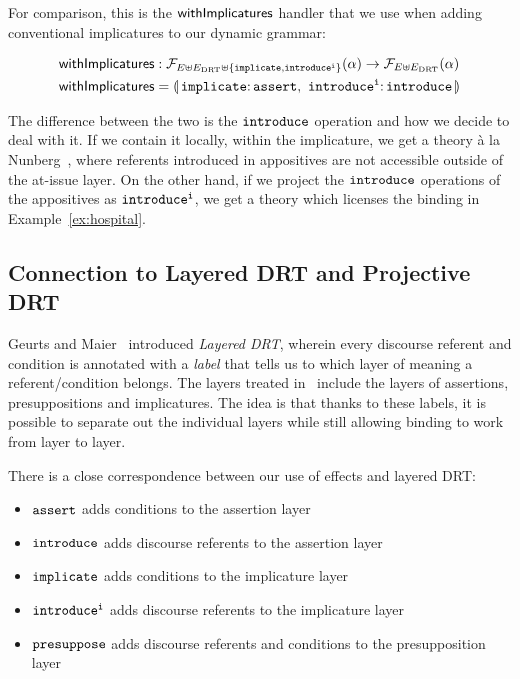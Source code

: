 For comparison, this is the $\mathsf{withImplicatures}$ handler that we use when
adding conventional implicatures to our dynamic grammar:

\begin{align*}
  \withImplicatures &: \FF_{E \uplus E_\DRT \uplus \{\op{implicate},\op{introduce^i}\}}(\alpha)
                   \to \FF_{E \uplus E_\DRT}(\alpha) \\
  \withImplicatures &= \banana{\onto{\op{implicate}}{\op{assert}},\
                               \onto{\op{introduce^i}}{\op{introduce}}}
\end{align*}

The difference between the two is the $\mathtt{introduce}$ operation and how we
decide to deal with it. If we contain it locally, within the implicature,
we get a theory à la Nunberg~\cite{nunberg1990linguistics}, where referents
introduced in appositives are not accessible outside of the at-issue
layer. On the other hand, if we project the $\mathtt{introduce}$ operations of
the appositives as $\mathtt{introduce^i}$, we get a theory which licenses the
binding in Example~\ref{ex:hospital}.


\subsection{Connection to Layered DRT and Projective DRT}

Geurts and Maier~\cite{geurts2003layered} introduced \emph{Layered DRT},
wherein every discourse referent and condition is annotated with a
\emph{label} that tells us to which layer of meaning a referent/condition
belongs. The layers treated in~\cite{geurts2003layered} include the layers
of assertions, presuppositions and implicatures. The idea is that thanks to
these labels, it is possible to separate out the individual layers while
still allowing binding to work from layer to layer.

There is a close correspondence between our use of effects and layered
DRT:

\begin{itemize}
\item $\mathtt{assert}$ adds conditions to the assertion layer
\item $\mathtt{introduce}$ adds discourse referents to the assertion layer
\item $\mathtt{implicate}$ adds conditions to the implicature layer
\item $\mathtt{introduce^i}$ adds discourse referents to the implicature layer
\item $\mathtt{presuppose}$ adds discourse referents and conditions to the
  presupposition layer
\end{itemize}

